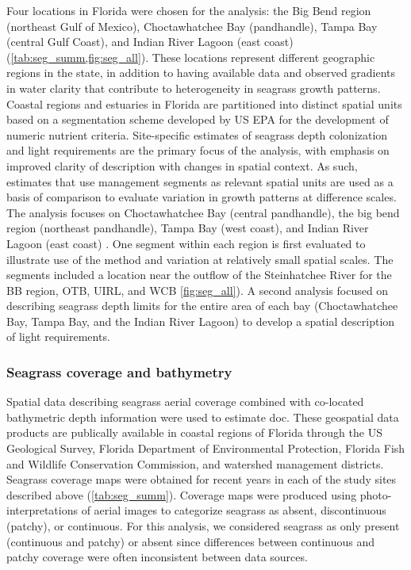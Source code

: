 \documentclass[letterpaper,12pt,oneside]{article}\usepackage[]{graphicx}\usepackage[]{color}
\begin{document}
Four locations in Florida were chosen for the analysis: the Big Bend region (northeast Gulf of Mexico), Choctawhatchee Bay (pandhandle), Tampa Bay (central Gulf Coast), and Indian River Lagoon (east coast) (\cref{tab:seg_summ,fig:seg_all}).  These locations represent different geographic regions in the state, in addition to having available data and observed gradients in water clarity that contribute to heterogeneity in seagrass growth patterns. Coastal regions and estuaries in Florida are partitioned into distinct spatial units based on a segmentation scheme developed by US \ac{EPA} for the development of numeric nutrient criteria.  Site-specific estimates of seagrass depth colonization and light requirements are the primary focus of the analysis, with emphasis on improved clarity of description with changes in spatial context.  As such, estimates that use management segments as relevant spatial units are used as a basis of comparison to evaluate variation in growth patterns at difference scales.  The analysis focuses on Choctawhatchee Bay (central pandhandle), the big bend region (northeast pandhandle), Tampa Bay (west coast), and Indian River Lagoon (east coast) .  One segment within each region is first evaluated to illustrate use of the method and variation at relatively small spatial scales.  The segments included a location near the outflow of the Steinhatchee River for the \ac{BB} region, \ac{OTB}, \ac{UIRL}, and \ac{WCB} \cref{fig:seg_all}).  A second analysis focused on describing seagrass depth limits for the entire area of each bay (Choctawhatchee Bay, Tampa Bay, and the Indian River Lagoon) to develop a spatial description of light requirements.

\subsubsection{Seagrass coverage and bathymetry} \label{sec:data_srcs}

Spatial data describing seagrass aerial coverage combined with co-located bathymetric depth information were used to estimate \ac{doc}.  These geospatial data products are publically available in coastal regions of Florida through the US Geological Survey, Florida Department of Environmental Protection, Florida Fish and Wildlife Conservation Commission, and watershed management districts.  Seagrass coverage maps were obtained for recent years in each of the study sites described above (\cref{tab:seg_summ}).  Coverage maps were produced using photo-interpretations of aerial images to categorize seagrass as absent, discontinuous (patchy), or continuous.  For this analysis, we considered seagrass as only present (continuous and patchy) or absent since differences between continuous and patchy coverage were often inconsistent between data sources. 
\end{document}
